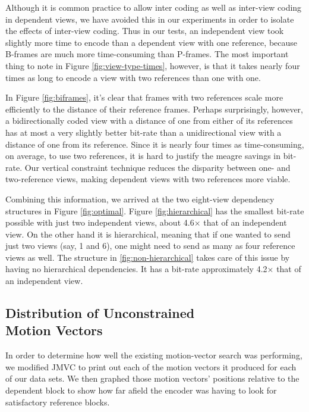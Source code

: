\documentclass{sig-alternate-05-2015}
\begin{document}
Although it is common practice to allow inter coding as well as inter-view
coding in dependent views, we have avoided this in our experiments in order
to isolate the effects of inter-view coding. Thus in our tests, an independent
view took slightly more time to encode than a dependent view with one reference,
because B-frames are much more time-consuming than P-frames. The most important
thing to note in Figure \ref{fig:view-type-times}, however, is that it takes
nearly four times as long to encode a view with two references than one with
one.

In Figure \ref{fig:biframes}, it's clear that frames with two references scale
more efficiently to the distance of their reference frames. Perhaps
surprisingly, however, a bidirectionally coded view with a distance of one from
either of its references has at most a very slightly better bit-rate than a
unidirectional view with a distance of one from its reference. Since it is
nearly four times as time-consuming, on average, to use two references, it is
hard to justify the meagre savings in bit-rate. Our vertical constraint
technique reduces the disparity between one- and two-reference views, making
dependent views with two references more viable.

Combining this information, we arrived at the two eight-view dependency
structures in Figure \ref{fig:optimal}. Figure \ref{fig:hierarchical} has the
smallest bit-rate possible with just two independent views, about 4.6$\times$
that of an independent view. On the other hand it is hierarchical, meaning that
if one wanted to send just two views (say, 1 and  6), one might need to send as
many as four reference views as well. The structure in
\ref{fig:non-hierarchical} takes care of this issue by having no hierarchical
dependencies. It has a bit-rate approximately 4.2$\times$ that of an independent
view.

\subsection{Distribution of Unconstrained \\ Motion Vectors}
\label{subsec:unconstrained}
In order to determine how well the existing motion-vector search was performing,
we modified JMVC to print out each of the motion vectors it produced for each of
our data sets. We then graphed those motion vectors' positions relative to the
dependent block to show how far afield the encoder was having to look for
satisfactory reference blocks.
\end{document}
